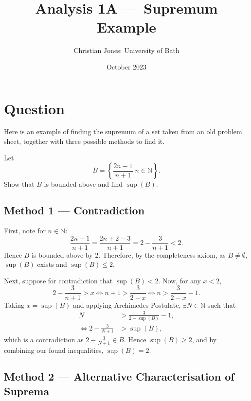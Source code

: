 \documentclass[
  10pt,
  a4paper]{article}
\title{Analysis 1A --- Supremum Example}
\author{Christian Jones: University of Bath}
\date{October 2023}
\theoremstyle{plain}
\theoremstyle{definition}
\theoremstyle{plain}
\theoremstyle{plain}
\theoremstyle{plain}
\theoremstyle{plain}
\theoremstyle{definition}
\theoremstyle{definition}
\newtheorem*{Order Axioms*}{Order Axioms}\newtheorem{Order Axioms}{Order Axioms}[section]
\theoremstyle{remark}
\theoremstyle{remark}
\let\BeginKnitrBlock\begin \let\EndKnitrBlock\end
\begin{document}
\maketitle

{
\setcounter{tocdepth}{2}
\tableofcontents
}
\newpage
{}

\hypertarget{question}{%
\section*{Question}\label{question}}

Here is an example of finding the supremum of a set taken from an old problem sheet, together with three possible methods to find it.
\BeginKnitrBlock{example}
{\label{exm:unnamed-chunk-2} }Let \[B = \left\lbrace \frac{2n-1}{n+1} \lvert n \in \mathbb{N}\right\rbrace.\] Show that \(B\) is bounded above and find \(\sup(B).\)
\EndKnitrBlock{example}

\hypertarget{method-1-contradiction}{%
\subsection*{Method 1 --- Contradiction}\label{method-1-contradiction}}

\BeginKnitrBlock{solution*}
First, note for \(n\in\mathbb{N}\): \[\frac{2n-1}{n+1} = \frac{2n+2-3}{n+1} = 2 - \frac{3}{n+1} < 2.\] Hence \(B\) is bounded above by \(2\). Therefore, by the completeness axiom, as \(B \neq \emptyset,\) \(\sup(B)\) exists and \(\sup(B) \leq 2.\)

Next, suppose for contradiction that \(\sup(B) < 2\). Now, for any \(x < 2,\) \[2 - \frac{3}{n+1} > x \Leftrightarrow n+1 > \frac{3}{2-x} \Leftrightarrow n > \frac{3}{2-x} - 1.\] Taking \(x = \sup(B)\) and applying Archimedes Postulate, \(\exists N \in \mathbb{N}\) such that
\begin{align*}
N &> \frac{3}{2-\sup(B)} - 1,\\
\Leftrightarrow 2 - \frac{3}{N+1} &> \sup(B),
\end{align*}
which is a contradiction as \(2 - \frac{3}{N+1} \in B.\) Hence \(\sup(B) \geq 2\), and by combining our found inequalities, \(\sup(B)=2\).
\EndKnitrBlock{solution*}

\hypertarget{method-2-alternative-characterisation-of-suprema}{%
\subsection*{Method 2 --- Alternative Characterisation of Suprema}\label{method-2-alternative-characterisation-of-suprema}}
\end{document}
